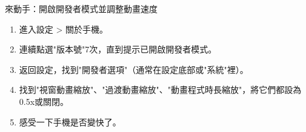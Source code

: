 \begin{tcbpractice}{來動手：開啟開發者模式並調整動畫速度}
\begin{enumerate}
  \item 進入設定 > 關於手機。
  \item 連續點選"版本號"7次，直到提示已開啟開發者模式。
  \item 返回設定，找到"開發者選項"（通常在設定底部或"系統"裡）。
  \item 找到"視窗動畫縮放"、"過渡動畫縮放"、"動畫程式時長縮放"，將它們都設為0.5x或關閉。
  \item 感受一下手機是否變快了。
\end{enumerate}

\end{tcbpractice}
